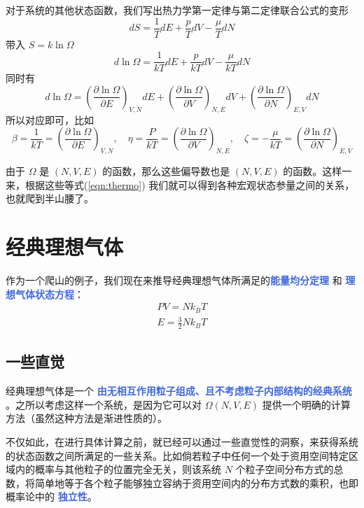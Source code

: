对于系统的其他状态函数，我们写出热力学第一定律与第二定律联合公式的变形
\[
    dS = \frac{1}{T} dE + \frac{p}{T} dV - \frac{\mu}{T} dN
\]
带入 $S = k \ln \Omega$ 
\begin{equation}
    d\ln \Omega = \frac{1}{kT} dE + \frac{p}{kT} dV - \frac{\mu}{kT} dN
\end{equation}
同时有
\begin{equation}
    d\ln \Omega = \left(\frac{\partial \ln \Omega}{\partial E}\right)_{V,N} dE + \left(\frac{\partial \ln \Omega}{\partial V}\right)_{N,E} dV + \left(\frac{\partial \ln \Omega}{\partial N}\right)_{E,V} dN
\end{equation}
所以对应即可，比如
\begin{equation}\label{eqn:thermo}
    \beta = \frac{1}{kT} =  \left(\frac{\partial \ln \Omega}{\partial E}\right)_{V,N},\quad \eta  = \frac{P}{kT}  = \left(\frac{\partial \ln \Omega}{\partial V}\right)_{N,E},\quad \zeta = -\frac{\mu}{kT}  = \left(\frac{\partial \ln \Omega}{\partial N}\right)_{E,V}
\end{equation}

由于 $\Omega$ 是 $(N,V,E)$ 的函数，那么这些偏导数也是 $(N,V,E)$ 的函数。这样一来，根据这些等式(\ref*{eqn:thermo}) 我们就可以得到各种宏观状态参量之间的关系，也就爬到半山腰了。



\section{经典理想气体}\label{sec:经典理想气体}

作为一个爬山的例子，我们现在来推导经典理想气体所满足的\textcolor{RoyalBlue}{\textbf{\kaishu 能量均分定理}} 和 \textcolor{RoyalBlue}{\textbf{\kaishu 理想气体状态方程}}：
\begin{align*}
    PV = Nk_BT \\
    E = \frac{3}{2}N k_B T
\end{align*}

\subsection{一些直觉}\label{intuition}

经典理想气体是一个 \textcolor{RoyalBlue}{\textbf{\kaishu 由无相互作用粒子组成、且不考虑粒子内部结构的经典系统}} 。之所以考虑这样一个系统，是因为它可以对 $\Omega(N,V,E)$ 提供一个明确的计算方法（虽然这种方法是渐进性质的）。 

不仅如此，在进行具体计算之前，就已经可以通过一些直觉性的洞察，来获得系统的状态函数之间所满足的一些关系。比如倘若粒子中任何一个处于资用空间特定区域内的概率与其他粒子的位置完全无关，则该系统  $N$ 个粒子空间分布方式的总数，将简单地等于各个粒子能够独立容纳于资用空间内的分布方式数的乘积，也即概率论中的 \textcolor{RoyalBlue}{\textbf{\kaishu 独立性}}。

